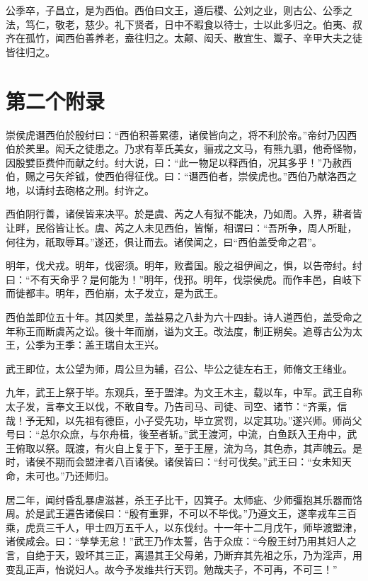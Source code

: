 \documentclass[UTF8,12pt,AutoFakeBold,fontset=fandol]{ctexart}
\begin{document}
\begin{appendices}
		公季卒，子昌立，是为西伯。西伯曰文王，遵后稷、公刘之业，则古公、公季之法，笃仁，敬老，慈少。礼下贤者，日中不暇食以待士，士以此多归之。伯夷、叔齐在孤竹，闻西伯善养老，盍往归之。太颠、闳夭、散宜生、鬻子、辛甲大夫之徒皆往归之。
		
		\pagebreak %
		
		\section{第二个附录\label{附录：第二个附录}}
		崇侯虎谮西伯於殷纣曰：“西伯积善累德，诸侯皆向之，将不利於帝。”帝纣乃囚西伯於羑里。闳夭之徒患之。乃求有莘氏美女，骊戎之文马，有熊九驷，他奇怪物，因殷嬖臣费仲而献之纣。纣大说，曰：“此一物足以释西伯，况其多乎！”乃赦西伯，赐之弓矢斧钺，使西伯得征伐。曰：“谮西伯者，崇侯虎也。”西伯乃献洛西之地，以请纣去砲格之刑。纣许之。
		
		西伯阴行善，诸侯皆来决平。於是虞、芮之人有狱不能决，乃如周。入界，耕者皆让畔，民俗皆让长。虞、芮之人未见西伯，皆惭，相谓曰：“吾所争，周人所耻，何往为，祇取辱耳。”遂还，俱让而去。诸侯闻之，曰“西伯盖受命之君”。
		
		明年，伐犬戎。明年，伐密须。明年，败耆国。殷之祖伊闻之，惧，以告帝纣。纣曰：“不有天命乎？是何能为！”明年，伐邘。明年，伐崇侯虎。而作丰邑，自岐下而徙都丰。明年，西伯崩，太子发立，是为武王。
		
		西伯盖即位五十年。其囚羑里，盖益易之八卦为六十四卦。诗人道西伯，盖受命之年称王而断虞芮之讼。後十年而崩，谥为文王。改法度，制正朔矣。追尊古公为太王，公季为王季：盖王瑞自太王兴。
		
		武王即位，太公望为师，周公旦为辅，召公、毕公之徒左右王，师脩文王绪业。
		
		九年，武王上祭于毕。东观兵，至于盟津。为文王木主，载以车，中军。武王自称太子发，言奉文王以伐，不敢自专。乃告司马、司徒、司空、诸节：“齐栗，信哉！予无知，以先祖有德臣，小子受先功，毕立赏罚，以定其功。”遂兴师。师尚父号曰：“总尔众庶，与尔舟楫，後至者斩。”武王渡河，中流，白鱼跃入王舟中，武王俯取以祭。既渡，有火自上复于下，至于王屋，流为乌，其色赤，其声魄云。是时，诸侯不期而会盟津者八百诸侯。诸侯皆曰：“纣可伐矣。”武王曰：“女未知天命，未可也。”乃还师归。
		
		居二年，闻纣昏乱暴虐滋甚，杀王子比干，囚箕子。太师疵、少师彊抱其乐器而饹周。於是武王遍告诸侯曰：“殷有重罪，不可以不毕伐。”乃遵文王，遂率戎车三百乘，虎贲三千人，甲士四万五千人，以东伐纣。十一年十二月戊午，师毕渡盟津，诸侯咸会。曰：“孳孳无怠！”武王乃作太誓，告于众庶：“今殷王纣乃用其妇人之言，自绝于天，毁坏其三正，离逷其王父母弟，乃断弃其先祖之乐，乃为淫声，用变乱正声，怡说妇人。故今予发维共行天罚。勉哉夫子，不可再，不可三！”
		\pagebreak
	\end{appendices}
	
\end{document}
